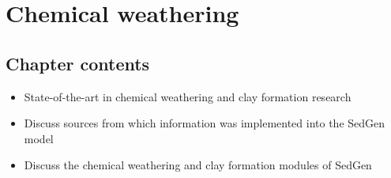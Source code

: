 \chapter{Chemical weathering}\label{ch:chemical_weathering}

\section{Chapter contents}
\begin{itemize}
    \item State-of-the-art in chemical weathering and clay formation research
    \item Discuss sources from which information was implemented into the SedGen model
    \item Discuss the chemical weathering and clay formation modules of SedGen

\end{itemize}




\cleardoublepage

